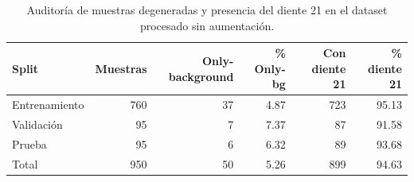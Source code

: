 \begin{table}[H]
\centering
\caption{Auditoría de muestras degeneradas y presencia del diente 21 en el dataset procesado sin aumentación.}
\label{tab:degenerate_samples_eda}
\begin{tabular}{lrrrrr}
\toprule
\textbf{Split} & \textbf{Muestras} & \textbf{Only-background} & \textbf{\% Only-bg} & \textbf{Con diente 21} & \textbf{\% diente 21} \\
\midrule
Entrenamiento & 760 & 37 & 4.87 & 723 & 95.13 \\
Validación & 95 & 7 & 7.37 & 87 & 91.58 \\
Prueba & 95 & 6 & 6.32 & 89 & 93.68 \\
\midrule
Total & 950 & 50 & 5.26 & 899 & 94.63 \\
\bottomrule
\end{tabular}
\end{table}